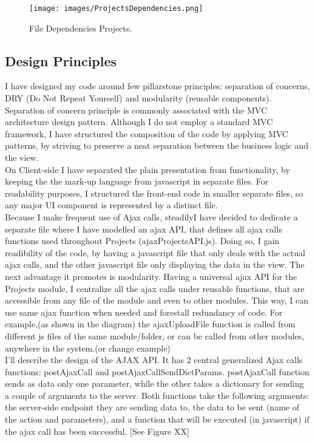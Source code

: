 \begin{figure}
\texttt{[image: images/ProjectsDependencies.png]}
\caption{File Dependencies Projects.}
\label{fig:file_dependencies_projects}
\end{figure}


\subsection{Design Principles}

I have designed my code around few pillarstone principles: separation of concerns, DRY (Do Not Repeat Yourself) and modularity (reusable components). Separation of concern principle is commonly associated with the MVC architecture design pattern. Although I do not employ a standard MVC framework, I have structured the composition of the code by applying MVC patterns, by striving to preserve a neat separation between the business logic and the view.\\ 

On Client-side I have separated the plain presentation from functionality, by keeping the the mark-up language from javascript in separate files. For readability purposes, I structured the front-end code in smaller separate files, so any major UI component is represented by a distinct file.\\ 

Because I make frequent use of Ajax calls, steadilyI have decided to dedicate a separate file where I have modelled an ajax API, that defines all ajax calls functions used throughout Projects (ajaxProjectsAPI.js). Doing so, I gain readibility of the code, by having a javascript file that only deals with the actual ajax calls, and the other javascript file only displaying the data in the view. The next advantage it promotes is modularity. Having a universal ajax API for the Projects module, I centralize all the ajax calls under reusable functions, that are accessible from any file of the module and even to other modules. This way, I can use same ajax function when needed and forestall redundancy of code.
For example,(as shown in the diagram) the ajaxUploadFile function is called from different js files of the same module/folder, or can be called from other modules, anywhere in the system.(or change example)\\ 

I'll describe the design of the AJAX API. It has 2 central generalized Ajax calls functions: postAjaxCall and postAjaxCallSendDictParams. postAjaxCall function sends as data only one parameter, while the other takes a dictionary for sending a couple of arguments to the server.
Both functions take the following arguments: the server-side endpoint they are sending data to, the data to be sent (name of the action and parameters), and a function that will be executed (in javascript) if the ajax call has been successful. [See Figure XX] \\ 

